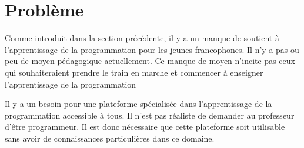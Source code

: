 \section{Problème}
\label{into-problem}
Comme introduit dans la section précédente, il y a un manque de soutient à l'apprentissage de la programmation pour les jeunes francophones. Il n'y a pas ou peu de moyen pédagogique actuellement. Ce manque de moyen n'incite pas ceux qui souhaiteraient prendre le train en marche et commencer à enseigner l'apprentissage de la programmation

Il y a un besoin pour une plateforme spécialisée dans l'apprentissage de la programmation accessible à tous. Il n'est pas réaliste de demander au professeur d'être programmeur. Il est donc nécessaire que cette plateforme soit utilisable sans avoir de connaissances particulières dans ce domaine.
